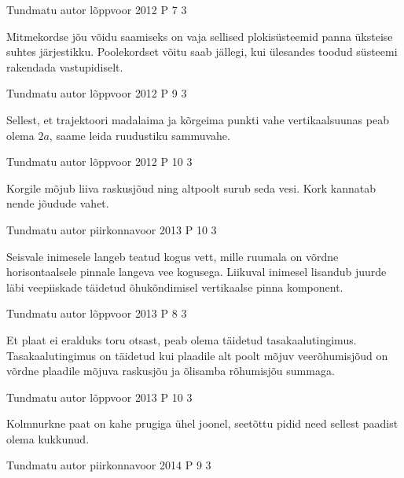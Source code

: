 \documentclass[11pt]{article}
\begin{document}
{%
{Tundmatu autor} %
{lõppvoor} %
{2012} %
{P 7} %
{3} %
{

\ifHint
Mitmekordse jõu võidu saamiseks on vaja sellised plokisüsteemid panna üksteise suhtes järjestikku. Poolekordset võitu saab jällegi, kui ülesandes toodud süsteemi rakendada vastupidiselt.
\fi
}

{Tundmatu autor} %
{lõppvoor} %
{2012} %
{P 9} %
{3} %
{

\ifHint
Sellest, et trajektoori madalaima ja kõrgeima punkti vahe vertikaalsuunas peab olema $2a$, saame leida ruudustiku sammuvahe.
\fi
}


{Tundmatu autor} %
{lõppvoor} %
{2012} %
{P 10} %
{3} %
{

\ifHint
Korgile mõjub liiva raskusjõud ning altpoolt surub seda vesi. Kork kannatab nende jõudude vahet.
\fi
}

{Tundmatu autor} %
{piirkonnavoor} %
{2013} %
{P 10} %
{3} %
{

\ifHint
Seisvale inimesele langeb teatud kogus vett, mille ruumala on võrdne horisontaalsele pinnale langeva vee kogusega. Liikuval inimesel lisandub juurde läbi veepiiskade täidetud õhukõndimisel vertikaalse pinna komponent.
\fi
}

{Tundmatu autor} %
{lõppvoor} %
{2013} %
{P 8} %
{3} %
{

\ifHint
Et plaat ei eralduks toru otsast, peab olema täidetud tasakaalutingimus. Tasakaalutingimus on täidetud kui plaadile alt poolt mõjuv veerõhumisjõud on võrdne plaadile mõjuva raskusjõu ja õlisamba rõhumisjõu summaga.
\fi
}

{Tundmatu autor} %
{lõppvoor} %
{2013} %
{P 10} %
{3} %
{

\ifHint
Kolmnurkne paat on kahe prugiga ühel joonel, seetõttu pidid need sellest paadist olema kukkunud.
\fi
}


{Tundmatu autor} %
{piirkonnavoor} %
{2014} %
{P 9} %
{3} %
{

}}
\end{document}
